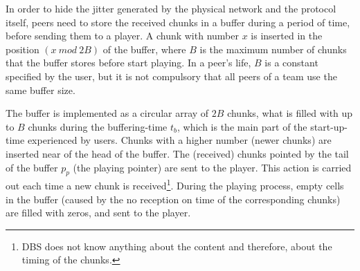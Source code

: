 

\label{sec:buffering_chunks}

In order to hide the jitter generated by the physical network and the
protocol itself, peers need to store the received chunks in a buffer
during a period of time, before sending them to a player. A chunk with
number $x$ is inserted in the position $(x~\mathit{mod}~2B)$ of the
buffer, where $B$ is the maximum number of chunks that the buffer
stores before start playing. In a peer's life, $B$ is a constant
specified by the user, but it is not compulsory that all peers of a
team use the same buffer size.

The buffer is implemented as a circular array of $2B$ chunks, what is
filled with up to $B$ chunks during the \gls{buffering-time} $t_b$,
which is the main part of the \gls{start-up-time} experienced by
users. Chunks with a higher number (newer chunks) are inserted near of
the head of the buffer. The (received) chunks pointed by the tail of
the buffer $p_p$ (the playing pointer) are sent to the player. This
action is carried out each time a new chunk is received\footnote{DBS
  does not know anything about the content and therefore, about the
  timing of the chunks.}. During the playing process, empty cells in
the buffer (caused by the no reception on time of the corresponding
chunks) are filled with zeros, and sent to the player.

